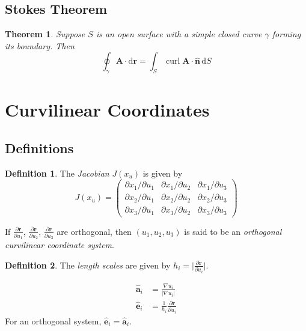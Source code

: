 \documentclass{article}
\newtheorem*{thm}{Theorem}
\theoremstyle{definition}
\theoremstyle{definition}
\newtheorem*{defn}{Definition}
\theoremstyle{remark}
\newcommand{\vecr}{\mathbf{r}}
\newcommand{\vecA}{\mathbf{A}}
\newcommand{\bhat}[1]{\mathbf{\hat{#1}}}
\newcommand{\nhat}{\bhat{n}}
\DeclareMathOperator{\vcurl}{curl}
\begin{document}
\subsection{Stokes Theorem}

\begin{thm}
Suppose $S$ is an open surface with a simple closed curve $\gamma$ forming its boundary. Then
\begin{equation*}
    \oint_\gamma \vecA \cdot \mathrm{d}\vecr = \int_S \vcurl \vecA \cdot \nhat \,\mathrm{d}S
\end{equation*}
\end{thm}

\section{Curvilinear Coordinates}

\subsection{Definitions}

\begin{defn}
    The \emph{Jacobian} $J(x_u)$ is given by
    \begin{equation*}
        J(x_u) =
        \begin{pmatrix}
            \partial x_1 / \partial u_1 & \partial x_1 / \partial u_2 & \partial x_1 / \partial u_3 \\
            \partial x_2 / \partial u_1 & \partial x_2 / \partial u_2 & \partial x_2 / \partial u_3 \\
            \partial x_3 / \partial u_1 & \partial x_3 / \partial u_2 & \partial x_3 / \partial u_3
        \end{pmatrix}
    \end{equation*}
\end{defn}
    
\noindent If $\frac{\partial \vecr}{\partial u_1}$, $\frac{\partial \vecr}{\partial u_2}$, $\frac{\partial \vecr}{\partial u_3}$ are orthogonal, then $(u_1, u_2, u_3)$ is said to be an \emph{orthogonal curvilinear coordinate system}.

\begin{defn}
     The \emph{length scales} are given by $h_i = \lvert \frac{\partial \vecr}{\partial u_i} \rvert$.
\end{defn}
\begin{align*}
    \bhat{a}_i &= \frac{\nabla u_i}{\lvert \nabla u_i \rvert} \\
    \bhat{e}_i &= \frac{1}{h_i} \frac{\partial \vecr}{\partial u_i}
\end{align*}
For an orthogonal system, $\bhat{e}_i = \bhat{a}_i$.
\end{document}
